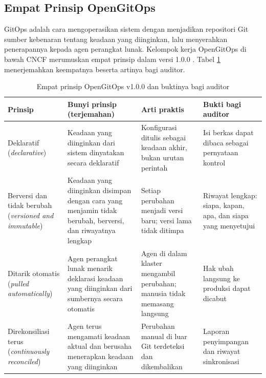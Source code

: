 \subsection{Empat Prinsip OpenGitOps}

GitOps adalah cara mengoperasikan sistem dengan menjadikan repositori Git sumber kebenaran tentang
keadaan yang diinginkan, lalu menyerahkan penerapannya kepada agen perangkat lunak. Kelompok kerja
OpenGitOps di bawah CNCF merumuskan empat prinsip dalam versi 1.0.0 \cite{opengitops}. Tabel
\ref{tab:ch13-prinsip-gitops} menerjemahkan keempatnya beserta artinya bagi auditor.

\begin{table}[!htb]
  \centering
  \caption{Empat prinsip OpenGitOps v1.0.0 \cite{opengitops} dan buktinya bagi auditor}
  \label{tab:ch13-prinsip-gitops}
  \footnotesize
  \begin{tabularx}{\textwidth}{>{\raggedright\arraybackslash}p{2.3cm} >{\raggedright\arraybackslash}X >{\raggedright\arraybackslash}X >{\raggedright\arraybackslash}X}
    \hline
    \textbf{Prinsip} & \textbf{Bunyi prinsip (terjemahan)} & \textbf{Arti praktis} &
      \textbf{Bukti bagi auditor} \\ \hline
    Deklaratif (\textit{declarative}) & Keadaan yang diinginkan dari sistem dinyatakan secara
      deklaratif & Konfigurasi ditulis sebagai keadaan akhir, bukan urutan perintah & Isi berkas
      dapat dibaca sebagai pernyataan kontrol \\ \hline
    Berversi dan tidak berubah (\textit{versioned and immutable}) & Keadaan yang diinginkan
      disimpan dengan cara yang menjamin tidak berubah, berversi, dan riwayatnya lengkap & Setiap
      perubahan menjadi versi baru; versi lama tidak ditimpa & Riwayat lengkap: siapa, kapan,
      apa, dan siapa yang menyetujui \\ \hline
    Ditarik otomatis (\textit{pulled automatically}) & Agen perangkat lunak menarik deklarasi
      keadaan yang diinginkan dari sumbernya secara otomatis & Agen di dalam klaster mengambil
      perubahan; manusia tidak memasang langsung & Hak ubah langsung ke produksi dapat dicabut
      \\ \hline
    Direkonsiliasi terus (\textit{continuously reconciled}) & Agen terus mengamati keadaan aktual
      dan berusaha menerapkan keadaan yang diinginkan & Perubahan manual di luar Git terdeteksi
      dan dikembalikan & Laporan penyimpangan dan riwayat sinkronisasi \\ \hline
  \end{tabularx}
\end{table}

